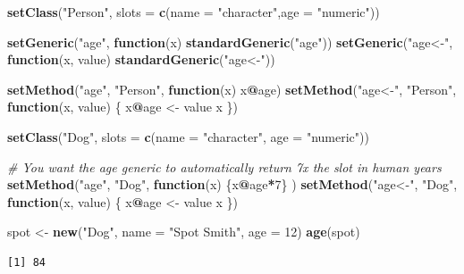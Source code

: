 \documentclass[]{book}
\newenvironment{Shaded}{\begin{snugshade}}{\end{snugshade}}
\newcommand{\CommentTok}[1]{\textcolor[rgb]{0.56,0.35,0.01}{\textit{#1}}}
\newcommand{\ControlFlowTok}[1]{\textcolor[rgb]{0.13,0.29,0.53}{\textbf{#1}}}
\newcommand{\DataTypeTok}[1]{\textcolor[rgb]{0.13,0.29,0.53}{#1}}
\newcommand{\DecValTok}[1]{\textcolor[rgb]{0.00,0.00,0.81}{#1}}
\newcommand{\KeywordTok}[1]{\textcolor[rgb]{0.13,0.29,0.53}{\textbf{#1}}}
\newcommand{\NormalTok}[1]{#1}
\newcommand{\OperatorTok}[1]{\textcolor[rgb]{0.81,0.36,0.00}{\textbf{#1}}}
\newcommand{\StringTok}[1]{\textcolor[rgb]{0.31,0.60,0.02}{#1}}
\begin{document}
\begin{Shaded}
\begin{Highlighting}[]
\KeywordTok{setClass}\NormalTok{(}\StringTok{"Person"}\NormalTok{, }\DataTypeTok{slots =} \KeywordTok{c}\NormalTok{(}\DataTypeTok{name =} \StringTok{"character"}\NormalTok{,}\DataTypeTok{age =} \StringTok{"numeric"}\NormalTok{))}

\KeywordTok{setGeneric}\NormalTok{(}\StringTok{"age"}\NormalTok{, }\ControlFlowTok{function}\NormalTok{(x) }\KeywordTok{standardGeneric}\NormalTok{(}\StringTok{"age"}\NormalTok{))}
\KeywordTok{setGeneric}\NormalTok{(}\StringTok{"age<-"}\NormalTok{, }\ControlFlowTok{function}\NormalTok{(x, value) }\KeywordTok{standardGeneric}\NormalTok{(}\StringTok{"age<-"}\NormalTok{))}

\KeywordTok{setMethod}\NormalTok{(}\StringTok{"age"}\NormalTok{, }\StringTok{"Person"}\NormalTok{, }\ControlFlowTok{function}\NormalTok{(x) x}\OperatorTok{@}\NormalTok{age)}
\KeywordTok{setMethod}\NormalTok{(}\StringTok{"age<-"}\NormalTok{, }\StringTok{"Person"}\NormalTok{, }\ControlFlowTok{function}\NormalTok{(x, value) \{}
\NormalTok{  x}\OperatorTok{@}\NormalTok{age <-}\StringTok{ }\NormalTok{value}
\NormalTok{  x}
\NormalTok{\})}

\KeywordTok{setClass}\NormalTok{(}\StringTok{"Dog"}\NormalTok{, }\DataTypeTok{slots =} \KeywordTok{c}\NormalTok{(}\DataTypeTok{name =} \StringTok{"character"}\NormalTok{,  }\DataTypeTok{age =} \StringTok{"numeric"}\NormalTok{))}

\CommentTok{# You want the age generic to automatically return 7x the slot in human years}
\KeywordTok{setMethod}\NormalTok{(}\StringTok{"age"}\NormalTok{, }\StringTok{"Dog"}\NormalTok{, }\ControlFlowTok{function}\NormalTok{(x) \{x}\OperatorTok{@}\NormalTok{age}\OperatorTok{*}\DecValTok{7}\NormalTok{\} ) }
\KeywordTok{setMethod}\NormalTok{(}\StringTok{"age<-"}\NormalTok{, }\StringTok{"Dog"}\NormalTok{, }\ControlFlowTok{function}\NormalTok{(x, value) \{}
\NormalTok{  x}\OperatorTok{@}\NormalTok{age <-}\StringTok{ }\NormalTok{value}
\NormalTok{  x}
\NormalTok{\})}


\NormalTok{spot <-}\StringTok{ }\KeywordTok{new}\NormalTok{(}\StringTok{"Dog"}\NormalTok{, }\DataTypeTok{name =} \StringTok{"Spot Smith"}\NormalTok{, }\DataTypeTok{age =} \DecValTok{12}\NormalTok{)}
\KeywordTok{age}\NormalTok{(spot)}
\end{Highlighting}
\end{Shaded}

\begin{verbatim}
[1] 84
\end{verbatim}
\end{document}
